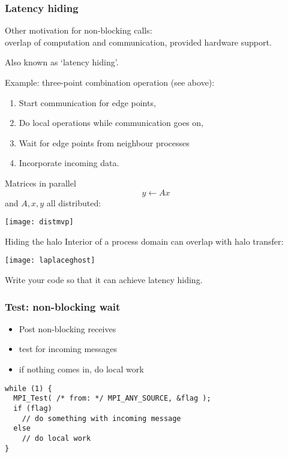 \begin{frame}[containsverbatim]\frametitle{Latency hiding}
  Other motivation for non-blocking calls:\\
  overlap of computation and communication, provided
  hardware support.

  Also known as `latency hiding'.

  Example: three-point combination operation (see above):
  \begin{enumerate}
  \item Start communication for edge points,
  \item Do local operations while communication goes on,
  \item Wait for edge points from neighbour processes
  \item Incorporate incoming data.
  \end{enumerate}
\end{frame}

\begin{frame}{Matrices in parallel}
  \[ y\leftarrow Ax\]
  and $A,x,y$ all distributed:

  \texttt{[image: distmvp]}
\end{frame}

\begin{frame}{Hiding the halo}
  Interior of a process domain can overlap with halo transfer:

  \texttt{[image: laplaceghost]}
\end{frame}

\begin{exerciseframe}[isendirecvarray]
  

  Write your code so that it can achieve latency hiding.
\end{exerciseframe}

\begin{frame}[containsverbatim]\frametitle{Test: non-blocking wait}
  \begin{itemize}
  \item Post non-blocking receives
  \item test for incoming messages
  \item if nothing comes in, do local work
  \end{itemize}
\lstset{language=C}
\begin{lstlisting}
while (1) {
  MPI_Test( /* from: */ MPI_ANY_SOURCE, &flag );
  if (flag)
    // do something with incoming message
  else
    // do local work
}
\end{lstlisting}
\end{frame}

